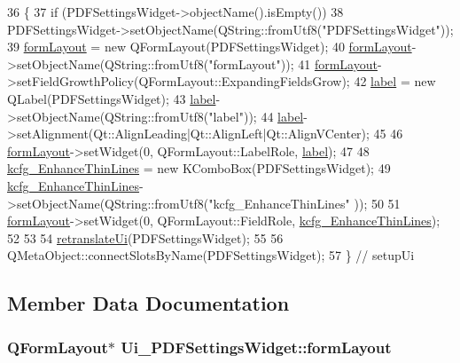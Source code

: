 \begin{DoxyCode}
36     \{
37         \textcolor{keywordflow}{if} (PDFSettingsWidget->objectName().isEmpty())
38             PDFSettingsWidget->setObjectName(QString::fromUtf8(\textcolor{stringliteral}{"PDFSettingsWidget"}));
39         \hyperlink{classUi__PDFSettingsWidget_a9a27abeea2f52398c9fd23eab5c60bce}{formLayout} = \textcolor{keyword}{new} QFormLayout(PDFSettingsWidget);
40         \hyperlink{classUi__PDFSettingsWidget_a9a27abeea2f52398c9fd23eab5c60bce}{formLayout}->setObjectName(QString::fromUtf8(\textcolor{stringliteral}{"formLayout"}));
41         \hyperlink{classUi__PDFSettingsWidget_a9a27abeea2f52398c9fd23eab5c60bce}{formLayout}->setFieldGrowthPolicy(QFormLayout::ExpandingFieldsGrow);
42         \hyperlink{classUi__PDFSettingsWidget_a330418abe746e160353aba80de5c435c}{label} = \textcolor{keyword}{new} QLabel(PDFSettingsWidget);
43         \hyperlink{classUi__PDFSettingsWidget_a330418abe746e160353aba80de5c435c}{label}->setObjectName(QString::fromUtf8(\textcolor{stringliteral}{"label"}));
44         \hyperlink{classUi__PDFSettingsWidget_a330418abe746e160353aba80de5c435c}{label}->setAlignment(Qt::AlignLeading|Qt::AlignLeft|Qt::AlignVCenter);
45 
46         \hyperlink{classUi__PDFSettingsWidget_a9a27abeea2f52398c9fd23eab5c60bce}{formLayout}->setWidget(0, QFormLayout::LabelRole, \hyperlink{classUi__PDFSettingsWidget_a330418abe746e160353aba80de5c435c}{label});
47 
48         \hyperlink{classUi__PDFSettingsWidget_ad49fd3583fc2d3fb249d46949fdd23d0}{kcfg\_EnhanceThinLines} = \textcolor{keyword}{new} KComboBox(PDFSettingsWidget);
49         \hyperlink{classUi__PDFSettingsWidget_ad49fd3583fc2d3fb249d46949fdd23d0}{kcfg\_EnhanceThinLines}->setObjectName(QString::fromUtf8(\textcolor{stringliteral}{"kcfg\_EnhanceThinLines"}
      ));
50 
51         \hyperlink{classUi__PDFSettingsWidget_a9a27abeea2f52398c9fd23eab5c60bce}{formLayout}->setWidget(0, QFormLayout::FieldRole, 
      \hyperlink{classUi__PDFSettingsWidget_ad49fd3583fc2d3fb249d46949fdd23d0}{kcfg\_EnhanceThinLines});
52 
53 
54         \hyperlink{classUi__PDFSettingsWidget_a6543867d868ad486b8f7b5b3fcadd189}{retranslateUi}(PDFSettingsWidget);
55 
56         QMetaObject::connectSlotsByName(PDFSettingsWidget);
57     \} \textcolor{comment}{// setupUi}
\end{DoxyCode}


\subsection{Member Data Documentation}
\hypertarget{classUi__PDFSettingsWidget_a9a27abeea2f52398c9fd23eab5c60bce}{
\subsubsection[{form\+Layout}]{\setlength{\rightskip}{0pt plus 5cm}Q\+Form\+Layout$\ast$ Ui\+\_\+\+P\+D\+F\+Settings\+Widget\+::form\+Layout}}\label{classUi__PDFSettingsWidget_a9a27abeea2f52398c9fd23eab5c60bce}


